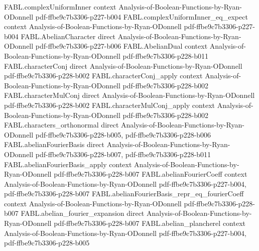 \begin{theorem}
\label{FABL.abelian_parseval}
\leanok
{}
\proofstep
  {FABL.complexUniformInner}
  {context}
  {Analysis-of-Boolean-Functions-by-Ryan-ODonnell}
  {pdf-ffbe9c7b3306-p227-b004}
\proofstep
  {FABL.complexUniformInner_eq_expect}
  {context}
  {Analysis-of-Boolean-Functions-by-Ryan-ODonnell}
  {pdf-ffbe9c7b3306-p227-b004}
\proofstep
  {FABL.AbelianCharacter}
  {direct}
  {Analysis-of-Boolean-Functions-by-Ryan-ODonnell}
  {pdf-ffbe9c7b3306-p227-b006}
\proofstep
  {FABL.AbelianDual}
  {context}
  {Analysis-of-Boolean-Functions-by-Ryan-ODonnell}
  {pdf-ffbe9c7b3306-p228-b011}
\proofstep
  {FABL.characterConj}
  {direct}
  {Analysis-of-Boolean-Functions-by-Ryan-ODonnell}
  {pdf-ffbe9c7b3306-p228-b002}
\proofstep
  {FABL.characterConj_apply}
  {context}
  {Analysis-of-Boolean-Functions-by-Ryan-ODonnell}
  {pdf-ffbe9c7b3306-p228-b002}
\proofstep
  {FABL.characterMulConj}
  {direct}
  {Analysis-of-Boolean-Functions-by-Ryan-ODonnell}
  {pdf-ffbe9c7b3306-p228-b002}
\proofstep
  {FABL.characterMulConj_apply}
  {context}
  {Analysis-of-Boolean-Functions-by-Ryan-ODonnell}
  {pdf-ffbe9c7b3306-p228-b002}
\proofstep
  {FABL.characters_orthonormal}
  {direct}
  {Analysis-of-Boolean-Functions-by-Ryan-ODonnell}
  {pdf-ffbe9c7b3306-p228-b005,
    pdf-ffbe9c7b3306-p228-b006}
\proofstep
  {FABL.abelianFourierBasis}
  {direct}
  {Analysis-of-Boolean-Functions-by-Ryan-ODonnell}
  {pdf-ffbe9c7b3306-p228-b007,
    pdf-ffbe9c7b3306-p228-b011}
\proofstep
  {FABL.abelianFourierBasis_apply}
  {context}
  {Analysis-of-Boolean-Functions-by-Ryan-ODonnell}
  {pdf-ffbe9c7b3306-p228-b007}
\proofstep
  {FABL.abelianFourierCoeff}
  {context}
  {Analysis-of-Boolean-Functions-by-Ryan-ODonnell}
  {pdf-ffbe9c7b3306-p227-b004,
    pdf-ffbe9c7b3306-p228-b007}
\proofstep
  {FABL.abelianFourierBasis_repr_eq_fourierCoeff}
  {context}
  {Analysis-of-Boolean-Functions-by-Ryan-ODonnell}
  {pdf-ffbe9c7b3306-p228-b007}
\proofstep
  {FABL.abelian_fourier_expansion}
  {direct}
  {Analysis-of-Boolean-Functions-by-Ryan-ODonnell}
  {pdf-ffbe9c7b3306-p228-b007}
\proofstep
  {FABL.abelian_plancherel}
  {context}
  {Analysis-of-Boolean-Functions-by-Ryan-ODonnell}
  {pdf-ffbe9c7b3306-p227-b004,
    pdf-ffbe9c7b3306-p228-b005}

\end{theorem}
